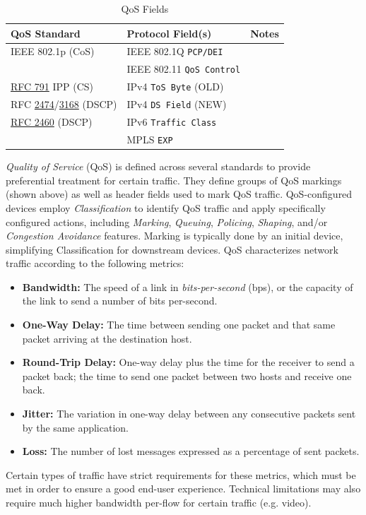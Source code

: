 \documentclass[12pt]{article}
\newcommand{\rfc}[1]{\href{https://datatracker.ietf.org/doc/html/rfc#1}{#1}}
\newcommand{\RFC}[1]{\href{https://datatracker.ietf.org/doc/html/rfc#1}{RFC #1}}
\begin{document}
	\begin{table}[H]
	\centering
	\caption{QoS Fields \label{tab:QOS FIELDS}}
	\begin{tabular}{llr}\hline
	\textbf{QoS Standard} 			& \textbf{Protocol Field(s)}		& \textbf{Notes}\\\hline
	IEEE 802.1p (CoS)				& IEEE 802.1Q \texttt{PCP/DEI} 	& \Cref{tab:802.1Q}\\\hline
							& IEEE 802.11 \texttt{QoS Control} 	& \Cref{subsec:802.11 WLANS}\\\hline
	\RFC{791} IPP (CS)			& IPv4 \texttt{ToS Byte} (OLD) 	& \Cref{subsec:IPV4}\\
	RFC \rfc{2474}/\rfc{3168} (DSCP)	& IPv4 \texttt{DS Field} (NEW) 	& \Cref{subsec:IPV4}\\\hline
	\RFC{2460} (DSCP)			& IPv6 \texttt{Traffic Class} 		& \Cref{subsec:IPV6}\\\hline
							& MPLS \texttt{EXP}\\\hline
	\end{tabular}\end{table}
	\textit{Quality of Service} (QoS) is defined across several standards to provide preferential treatment for certain traffic. They define groups of QoS markings (shown above) as well as header fields used to mark QoS traffic. QoS-configured devices employ \textit{Classification} to identify QoS traffic and apply specifically configured actions, including \textit{Marking}, \textit{Queuing}, \textit{Policing}, \textit{Shaping}, and/or \textit{Congestion Avoidance} features. Marking is typically done by an initial device, simplifying Classification for downstream devices. QoS characterizes network traffic according to the following metrics:

	\begin{itemize}
		\label{itm:QOS METRICS}
		\item{\textbf{Bandwidth:} The speed of a link in \textit{bits-per-second} (bps), or the capacity of the link to send a number of bits per-second.}
		\item{\textbf{One-Way Delay:} The time between sending one packet and that same packet arriving at the destination host.}
		\item{\textbf{Round-Trip Delay:} One-way delay plus the time for the receiver to send a packet back; the time to send one packet between two hosts and receive 					one back.}
		\item{\textbf{Jitter:} The variation in one-way delay between any consecutive packets sent by the same application.}
		\item{\textbf{Loss:} The number of lost messages expressed as a percentage of sent packets.}
	\end{itemize}
	Certain types of traffic have strict requirements for these metrics, which must be met in order to ensure a good end-user experience. Technical limitations may also require much higher bandwidth per-flow for certain traffic (e.g. video).
	
\end{document}
